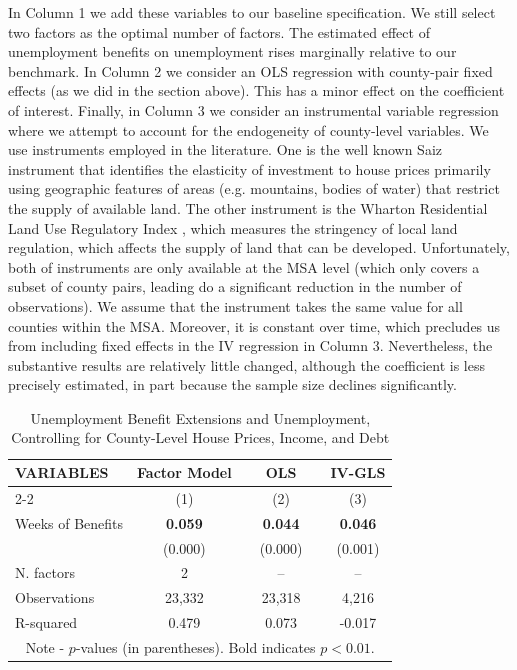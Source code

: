 \documentclass[12pt]{article}
\newcommand{\1}{\mathbf{1}}
\begin{document}
\begin{appendix}
In Column 1 we add these variables to our baseline specification. We still select two factors as the optimal number of factors. The estimated effect of unemployment benefits on unemployment rises marginally relative to our benchmark. In Column 2 we consider an OLS regression with county-pair fixed effects (as we did in the section above). This has a minor effect on the coefficient of interest. Finally, in Column 3 we consider an instrumental variable regression where we attempt to account for the endogeneity of county-level variables. We use instruments employed in the literature. One is the well known Saiz instrument \citep{saiz:10,data:saiz-qje} that identifies the elasticity of investment to house prices primarily using geographic features of areas (e.g. mountains, bodies of water) that restrict the supply of available land. The other instrument is the Wharton Residential Land Use Regulatory Index \citep{gyourko+saiz+summers:08}, which measures the stringency of local land regulation, which affects the supply of land that can be developed. Unfortunately, both of instruments are only available at the MSA level (which only covers a subset of county pairs, leading do a significant reduction in the number of observations). We assume that the instrument takes the same value for all counties within the MSA. Moreover, it is constant over time, which precludes us from including fixed effects in the IV regression in Column 3. Nevertheless, the substantive results are relatively little changed, although the coefficient is less precisely estimated, in part because the sample size declines significantly. 

\begin{table}[H]
  \centering
	\captionsetup{justification=centering}
   \caption{Unemployment Benefit Extensions and Unemployment, \\ Controlling for County-Level House Prices, Income, and Debt} \label{tab:Endog_Vars}
\small
    \begin{tabular}{lccccc} \hline
    VARIABLES & Factor Model &&  OLS &&  IV-GLS \\ \cline{2-2} \cline{4-4} \cline{6-6}
    				  & (1) && (2) && (3) \\ \hline
Weeks of  Benefits & \bf{0.059} && \bf{0.044} && \bf{0.046} \\
									 & (0.000)	  && (0.000)	 	 &&  (0.001)\\

N. factors   & 2 && -- && --   \\
Observations & 23,332 && 23,318 && 4,216  \\
R-squared    & 0.479 && 0.073 && -0.017  \\ \hline
\multicolumn{6}{c}{\footnotesize Note - $p$-values (in parentheses). Bold indicates $p<0.01$.} \\
\end{tabular}
\vspace{-0.2cm}
\end{table}



\end{appendix}
\end{document}
